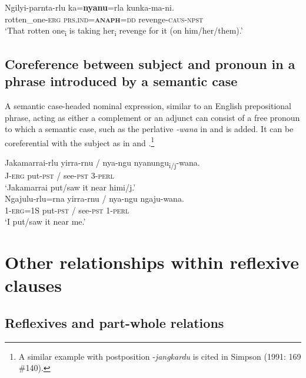 \documentclass[output=paper]{../langscibook}
\begin{document}
\ex
\label{ex:laughren:16c}
\gll Ngilyi-parnta-rlu  ka=\textbf{{nyanu}}=rla  kunka-ma-ni.\\
    rotten\_one-\textsc{erg}  \textsc{prs.ind=}\textbf{\textsc{anaph}}\textsc{=dd}  revenge-\textsc{caus-npst}\\
\glt `That rotten one\textsubscript{i} is taking her\textsubscript{i} revenge for it (on him/her/them).'
\z
\z


\subsection{Coreference between subject and pronoun in a phrase introduced by a semantic case}\label{sec:laughren:2.3}

A semantic case-headed nominal expression, similar to an English prepositional phrase, acting as either a complement or an adjunct can consist of a free pronoun to which a semantic case, such as the perlative \textit{{}-wana} in  and  is added. It can be coreferential with the subject as in  and .\footnote{A similar example with postposition -\textit{jangkardu} is cited in Simpson (1991: 169 \#140).}

\ea%
\label{ex:laughren:17}
\ea
\label{ex:laughren:17a}
\gll Jakamarrai-rlu	yirra-rnu {/} nya-ngu	nyanungu\textsubscript{i/j}-wana.\\
J-\textsc{erg} put-\textsc{pst} {/} see-\textsc{pst}	3-\textsc{perl}\\
\glt `Jakamarrai put/saw it near himi/j.' \\

\ex
\label{ex:laughren:17b}
\gll Ngajulu-rlu=rna yirra-rnu {/} nya-ngu	ngaju-wana.\\
1-\textsc{erg}=1S put-\textsc{pst} {/} see-\textsc{pst} 1-\textsc{perl}\\
\glt `I put/saw it near me.'\\
\z
\z 
		 

\section{Other relationships within reflexive clauses}\label{sec:laughren:3}

\subsection{Reflexives and part-whole relations}\label{sec:laughren:3.1}
\end{document}
